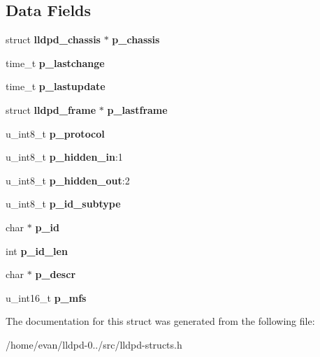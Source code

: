 \subsection*{\-Data \-Fields}
\begin{DoxyCompactItemize}
\item 
struct {\bf lldpd\-\_\-chassis} $\ast$ {\bfseries p\-\_\-chassis}\label{structlldpd__port_a1fbb711b1dd410b7dc074f08ef146b07}

\item 
time\-\_\-t {\bfseries p\-\_\-lastchange}\label{structlldpd__port_a63569e6cf9a969054c8077c77163b586}

\item 
time\-\_\-t {\bfseries p\-\_\-lastupdate}\label{structlldpd__port_a08a6cb7db3c8ab6d8ea65f7e82681493}

\item 
struct {\bf lldpd\-\_\-frame} $\ast$ {\bfseries p\-\_\-lastframe}\label{structlldpd__port_a176473e3642a9cfb592c02d180498295}

\item 
u\-\_\-int8\-\_\-t {\bfseries p\-\_\-protocol}\label{structlldpd__port_a9a660cb6b45f55f16e3ee05e688ddc10}

\item 
u\-\_\-int8\-\_\-t {\bfseries p\-\_\-hidden\-\_\-in}\-:1\label{structlldpd__port_a84ce3176e6ed630c91e22fe010668e04}

\item 
u\-\_\-int8\-\_\-t {\bfseries p\-\_\-hidden\-\_\-out}\-:2\label{structlldpd__port_a281cd99369a278dcfcc69013dcde7b1d}

\item 
u\-\_\-int8\-\_\-t {\bfseries p\-\_\-id\-\_\-subtype}\label{structlldpd__port_aeb1bf4ece0d6b2301fa80f1a3e51d404}

\item 
char $\ast$ {\bfseries p\-\_\-id}\label{structlldpd__port_a648ffb147aca15b1f312a0e559fa8d03}

\item 
int {\bfseries p\-\_\-id\-\_\-len}\label{structlldpd__port_a333703b761444a09d1aae48223cdaabd}

\item 
char $\ast$ {\bfseries p\-\_\-descr}\label{structlldpd__port_a1810b6c397ef8fc2b43b87bbc95ac978}

\item 
u\-\_\-int16\-\_\-t {\bfseries p\-\_\-mfs}\label{structlldpd__port_add73e76bed00e12617edcb936080ecec}

\end{DoxyCompactItemize}


\-The documentation for this struct was generated from the following file\-:\begin{DoxyCompactItemize}
\item 
/home/evan/lldpd-\/0../src/lldpd-\/structs.\-h\end{DoxyCompactItemize}

